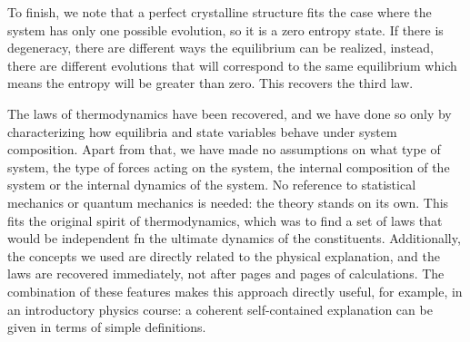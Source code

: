 \documentclass[letterpaper,twocolumn]{article}
\begin{document}
To finish, we note that a perfect crystalline structure fits the case where the system has only one possible evolution, so it is a zero entropy state. If there is degeneracy, there are different ways the equilibrium can be realized, instead, there are different evolutions that will correspond to the same equilibrium which means the entropy will be greater than zero. This recovers the third law.

The laws of thermodynamics have been recovered, and we have done so only by characterizing how equilibria and state variables behave under system composition. Apart from that, we have made no assumptions on what type of system, the type of forces acting on the system, the internal composition of the system or the internal dynamics of the system. No reference to statistical mechanics or quantum mechanics is needed: the theory stands on its own. This fits the original spirit of thermodynamics, which was to find a set of laws that would be independent fn the ultimate dynamics of the constituents. Additionally, the concepts we used are directly related to the physical explanation, and the laws are recovered immediately, not after pages and pages of calculations. The combination of these features makes this approach directly useful, for example, in an introductory physics course: a coherent self-contained explanation can be given in terms of simple definitions.




\end{document}

